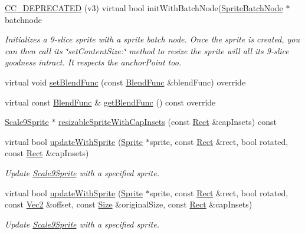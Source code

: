 \begin{DoxyCompactItemize}
\hyperlink{classui_1_1Scale9Sprite_ac7989890a826ab703510c852f87e9ebe}{C\+C\+\_\+\+D\+E\+P\+R\+E\+C\+A\+T\+ED} (v3) virtual bool init\+With\+Batch\+Node(\hyperlink{classSpriteBatchNode}{Sprite\+Batch\+Node} $\ast$batchnode
\begin{DoxyCompactList}\small\item\em Initializes a 9-\/slice sprite with a sprite batch node. Once the sprite is created, you can then call its \char`\"{}set\+Content\+Size\+:\char`\"{} method to resize the sprite will all it\textquotesingle{}s 9-\/slice goodness intract. It respects the anchor\+Point too. \end{DoxyCompactList}\item 
virtual void \hyperlink{classui_1_1Scale9Sprite_a23f274883a4d7ce548f2f0cbd94d33d5}{set\+Blend\+Func} (const \hyperlink{structBlendFunc}{Blend\+Func} \&blend\+Func) override
\item 
virtual const \hyperlink{structBlendFunc}{Blend\+Func} \& \hyperlink{classui_1_1Scale9Sprite_a7dc2626532997c46ec8ee9c1a9424491}{get\+Blend\+Func} () const override
\item 
\hyperlink{classui_1_1Scale9Sprite}{Scale9\+Sprite} $\ast$ \hyperlink{classui_1_1Scale9Sprite_a8ebd4f16a7d9014560e36642a93c6568}{resizable\+Sprite\+With\+Cap\+Insets} (const \hyperlink{classRect}{Rect} \&cap\+Insets) const
\item 
virtual bool \hyperlink{classui_1_1Scale9Sprite_ae704adeed30b4193db1ebab6ccd8fe40}{update\+With\+Sprite} (\hyperlink{classSprite}{Sprite} $\ast$sprite, const \hyperlink{classRect}{Rect} \&rect, bool rotated, const \hyperlink{classRect}{Rect} \&cap\+Insets)
\begin{DoxyCompactList}\small\item\em Update \hyperlink{classui_1_1Scale9Sprite}{Scale9\+Sprite} with a specified sprite. \end{DoxyCompactList}\item 
virtual bool \hyperlink{classui_1_1Scale9Sprite_abfd4f54e2b04a7046bef1d21eabe4e60}{update\+With\+Sprite} (\hyperlink{classSprite}{Sprite} $\ast$sprite, const \hyperlink{classRect}{Rect} \&rect, bool rotated, const \hyperlink{classVec2}{Vec2} \&offset, const \hyperlink{classSize}{Size} \&original\+Size, const \hyperlink{classRect}{Rect} \&cap\+Insets)
\begin{DoxyCompactList}\small\item\em Update \hyperlink{classui_1_1Scale9Sprite}{Scale9\+Sprite} with a specified sprite. \end{DoxyCompactList}\item 

\end{DoxyCompactItemize}
